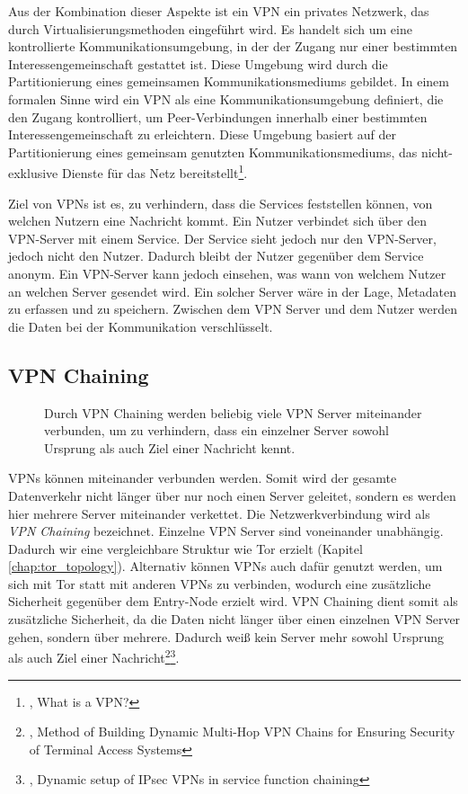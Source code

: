 Aus der Kombination dieser Aspekte ist ein VPN ein privates Netzwerk, das durch Virtualisierungsmethoden eingeführt wird. Es handelt sich um eine kontrollierte Kommunikationsumgebung, in der der Zugang nur einer bestimmten Interessengemeinschaft gestattet ist. Diese Umgebung wird durch die Partitionierung eines gemeinsamen Kommunikationsmediums gebildet.
In einem formalen Sinne wird ein VPN als eine Kommunikationsumgebung definiert, die den Zugang kontrolliert, um Peer-Verbindungen innerhalb einer bestimmten Interessengemeinschaft zu erleichtern. Diese Umgebung basiert auf der Partitionierung eines gemeinsam genutzten Kommunikationsmediums, das nicht-exklusive Dienste für das Netz bereitstellt\footnote{\cite{DefinitionOfVPN}, What is a VPN?}.

Ziel von VPNs ist es, zu verhindern, dass die Services feststellen können, von welchen Nutzern eine Nachricht kommt. Ein Nutzer verbindet sich über den VPN-Server mit einem Service. Der Service sieht jedoch nur den VPN-Server, jedoch nicht den Nutzer. Dadurch bleibt der Nutzer gegenüber dem Service anonym.
Ein VPN-Server kann jedoch einsehen, was wann von welchem Nutzer an welchen Server gesendet wird. Ein solcher Server wäre in der Lage, Metadaten zu erfassen und zu speichern. Zwischen dem VPN Server und dem Nutzer werden die Daten bei der Kommunikation verschlüsselt.

\subsection{VPN Chaining}
\label{chap:vpn_chaining}

\begin{figure}[!h]
    \centering
    
    \caption{Durch VPN Chaining werden beliebig viele VPN Server miteinander verbunden, um zu verhindern, dass ein einzelner Server sowohl Ursprung als auch Ziel einer Nachricht kennt.}
    \label{imgs:vpn_chaining}
\end{figure}

VPNs können miteinander verbunden werden. Somit wird der gesamte Datenverkehr nicht länger über nur noch einen Server geleitet, sondern es werden hier mehrere Server miteinander verkettet. Die Netzwerkverbindung wird als \textit{VPN Chaining} bezeichnet. Einzelne VPN Server sind voneinander unabhängig. Dadurch wir eine vergleichbare Struktur wie Tor erzielt (Kapitel \ref{chap:tor_topology}). Alternativ können VPNs auch dafür genutzt werden, um sich mit Tor statt mit anderen VPNs zu verbinden, wodurch eine zusätzliche Sicherheit gegenüber dem Entry-Node erzielt wird. VPN Chaining dient somit als zusätzliche Sicherheit, da die Daten nicht länger über einen einzelnen VPN Server gehen, sondern über mehrere. Dadurch weiß kein Server mehr sowohl Ursprung als auch Ziel einer Nachricht\footnote{\cite{VPNChains}, Method of Building Dynamic Multi-Hop VPN Chains for Ensuring Security of Terminal Access Systems}\footnote{\cite{SetupOfVPNChaining}, Dynamic setup of IPsec VPNs in service function chaining}.

